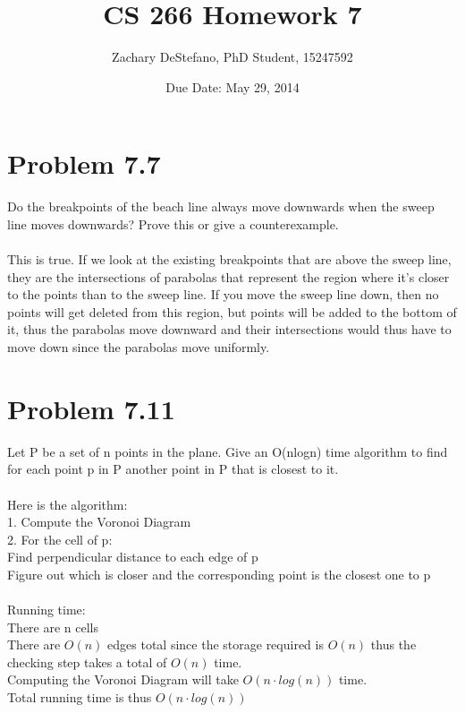 \documentclass[11pt,psfig]{article}
\begin{document}
\setlength{\parskip}{1.2ex plus0.3ex minus 0.3ex}


\thispagestyle{empty} \pagestyle{myheadings} 



\title{CS 266 Homework 7}
\author{Zachary DeStefano, PhD Student, 15247592}
\date{Due Date: May 29, 2014}

\maketitle

\vfill\eject

\section*{Problem 7.7}
Do the breakpoints of the beach line always move downwards when the
sweep line moves downwards? Prove this or give a counterexample.\\
\\
This is true. If we look at the existing breakpoints that are above the sweep line, they are the intersections of parabolas that represent the region where it's closer to the points than to the sweep line. If you move the sweep line down, then no points will get deleted from this region, but points will be added to the bottom of it, thus the parabolas move downward and their intersections would thus have to move down since the parabolas move uniformly. 

\section*{Problem 7.11}

Let P be a set of n points in the plane. Give an O(nlogn) time algorithm
to find for each point p in P another point in P that is closest to it.\\
\\
Here is the algorithm:\\
1. Compute the Voronoi Diagram\\
2. For the cell of p:\\
Find perpendicular distance to each edge of p\\
Figure out which is closer and the corresponding point is the closest one to p\\
\\
Running time:\\
There are n cells\\
There are $O(n)$ edges total since the storage required is $O(n)$ thus the checking step takes a total of $O(n)$ time. \\
Computing the Voronoi Diagram will take $O(n \cdot log(n))$ time. \\
Total running time is thus $O(n \cdot log(n))$
\end{document}
